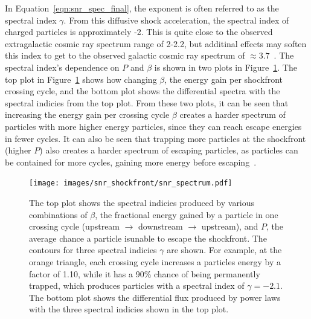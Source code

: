   In Equation~\ref{eqn:snr_spec_final}, the exponent is often referred to as the spectral index $\gamma$.
  From this diffusive shock acceleration, the spectral index of charged particles is approximately -2.
  This is quite close to the observed extragalactic cosmic ray spectrum range of 2-2.2, but additinal effects may soften this index to get to the observed galactic cosmic ray spectrum of $\approx{}3.7$~\cite{cosmicrayspectrumorigin}.
  The spectral index's dependence on $P$ and $\beta$ is shown in two plots in Figure~\ref{fig:snr_spectrum}.
  The top plot in Figure~\ref{fig:snr_spectrum} shows how changing $\beta$, the energy gain per shockfront crossing cycle, and the bottom plot shows the differential spectra with the spectral indicies from the top plot.
  From these two plots, it can be seen that increasing the energy gain per crossing cycle $\beta$ creates a harder spectrum of particles with more higher energy particles, since they can reach escape energies in fewer cycles.
  It can also be seen that trapping more particles at the shockfront (higher $P$) also creates a harder spectrum of escaping particles, as particles can be contained for more cycles, gaining more energy before escaping~\cite{dsa6}.

  \begin{figure}[ht]
    \centering
    \texttt{[image: images/snr\_shockfront/snr\_spectrum.pdf]}
    \caption[Supernova Diffuse Acceleration Spectral Indicies]{
      The top plot shows the spectral indicies produced by various combinations of $\beta$, the fractional energy gained by a particle in one crossing cycle (upstream $\rightarrow$ downstream $\rightarrow$ upstream), and $P$, the average chance a particle isunable to escape the shockfront.
      The contours for three spectral indicies $\gamma$ are shown.
      For example, at the orange triangle, each crossing cycle increases a particles energy by a factor of 1.10, while it has a 90\% chance of being permanently trapped, which produces particles with a spectral index of $\gamma=-2.1$.
      The bottom plot shows the differential flux produced by power laws with the three spectral indicies shown in the top plot.
    }\label{fig:snr_spectrum}
  \end{figure}
  
  \FloatBarrier
  
  
  
